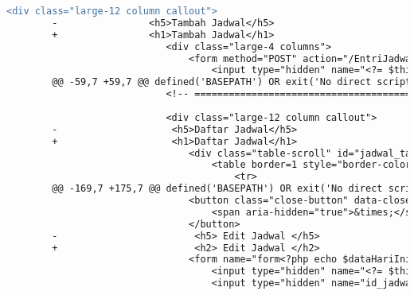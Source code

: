 \begin{itemize}
\begin{lstlisting}[frame=single, label={lst:perbaikan_1.3.1_tag_heading}, language=diff, caption=Perbaikan Kriteria Sukses 1.3.1 - Penggunaan \textit{Heading} Tidak Tepat]
                        <div class="large-12 column callout">
        -                <h5>Tambah Jadwal</h5>
        +                <h1>Tambah Jadwal</h1>
                            <div class="large-4 columns">
                                <form method="POST" action="/EntriJadwalDosen/add">
                                    <input type="hidden" name="<?= $this->security->get_csrf_token_name() ?>" value="<?= $this->security->get_csrf_hash() ?>" />
        @@ -59,7 +59,7 @@ defined('BASEPATH') OR exit('No direct script access allowed');
                            <!-- ===================================================================== Pembentukan Tabel ============================================================================= -->
            
                            <div class="large-12 column callout">
        -                    <h5>Daftar Jadwal</h5>
        +                    <h1>Daftar Jadwal</h1>
                                <div class="table-scroll" id="jadwal_table">
                                    <table border=1 style="border-color:black ; border-collapse:separate">
                                        <tr>
        @@ -169,7 +175,7 @@ defined('BASEPATH') OR exit('No direct script access allowed');
                                <button class="close-button" data-close aria-label="Close modal" type="button">
                                    <span aria-hidden="true">&times;</span>
                                </button>
        -                        <h5> Edit Jadwal </h5>
        +                        <h2> Edit Jadwal </h2>
                                <form name="form<?php echo $dataHariIni->id ?>" method="POST" action="/EntriJadwalDosen/update/<?php echo $dataHariIni->id ?>">
                                    <input type="hidden" name="<?= $this->security->get_csrf_token_name() ?>" value="<?= $this->security->get_csrf_hash() ?>" />
                                    <input type="hidden" name="id_jadwal_parameter" value="<?php echo $dataHariIni->id ?>"> </a> <br>
    \end{lstlisting}


\end{itemize}
